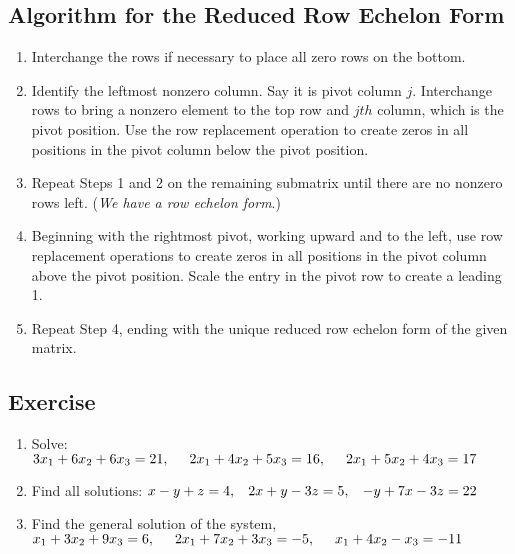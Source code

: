 \documentclass[math101_lecturenotes_ku.tex]{subfiles}
\begin{document}
\subsection{Algorithm for the Reduced Row Echelon Form}
\begin{enumerate}
    \item Interchange the rows if necessary to place all zero rows on the bottom.
    \item Identify the leftmost nonzero column. Say it is pivot column $j$. Interchange rows to bring a nonzero element to the top row and $jth$ column, which is the pivot position. Use the row replacement operation to create zeros in all positions in the pivot column below the pivot position.

    \item Repeat Steps 1 and 2 on the remaining submatrix until there are no nonzero rows left. (\textit{We have a row echelon form}.)

    \item Beginning with the rightmost pivot, working upward and to the left, use row replacement operations to create zeros in all positions in the pivot column above the pivot position. Scale the entry in the pivot row to create a leading 1.

    \item Repeat Step 4, ending with the unique reduced row echelon form of the given matrix.
\end{enumerate}

\subsection{Exercise}
\begin{enumerate}
    \item Solve: \hspace{2mm} $3x_1+6x_2+6x_3=21, \hspace{5mm} 2x_1+4x_2+5x_3=16, \hspace{5mm}
    2x_1+5x_2+4x_3=17$

    \item Find all solutions: \hspace{2mm} $x-y+z=4, \hspace{3mm} 2x+y-3z=5, \hspace{3mm} -y+7x-3z=22$

    \item Find the general solution of the system,
    $x_1+3x_2+9x_3=6, \hspace{5mm}
    2x_1+7x_2+3x_3=-5, \hspace{5mm}
    x_1+4x_2-x_3=-11$
\end{enumerate}
\end{document}
